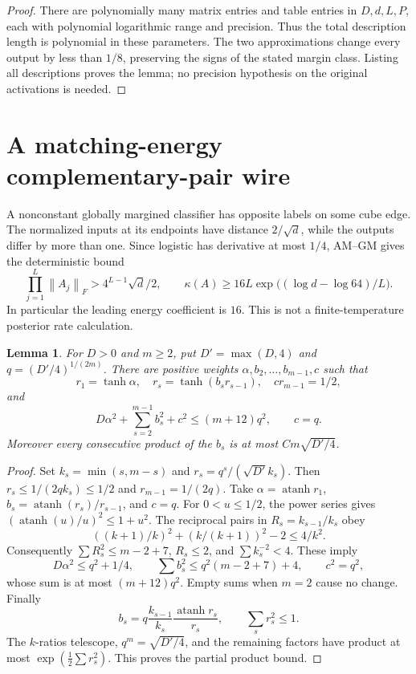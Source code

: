 \documentclass[11pt]{article}
\newtheorem{lemma}[theorem]{Lemma}
\theoremstyle{remark}\newtheorem{remark}[theorem]{Remark}
\newcommand{\norm}[1]{\left\lVert #1\right\rVert}
\begin{document}
\begin{proof}
There are polynomially many matrix entries and table entries in
$D,d,L,P$, each with polynomial logarithmic range and precision. Thus
the total description length is polynomial in these parameters. The
two approximations change every output by less than $1/8$, preserving
the signs of the stated margin class. Listing all descriptions proves
the lemma; no precision hypothesis on the original activations is needed.
\end{proof}

\section{A matching-energy complementary-pair wire}

A nonconstant globally margined classifier has opposite labels on some
cube edge. The normalized inputs at its endpoints have distance
$2/\sqrt d$, while the outputs differ by more than one. Since logistic
has derivative at most $1/4$, AM--GM gives the deterministic bound
\begin{equation}\label{eq:lower}
 \prod_{j=1}^L\norm{A_j}_F>4^{L-1}\sqrt d/2,\qquad
 \kappa(A)\ge16L\exp\bigl((\log d-\log64)/L\bigr).
\end{equation}
In particular the leading energy coefficient is $16$. This is not a
finite-temperature posterior rate calculation.

\begin{lemma}\label{lem:scalar}
For $D>0$ and $m\ge2$, put $D'=\max(D,4)$ and
$q=(D'/4)^{1/(2m)}$. There are positive weights
$\alpha,b_2,\ldots,b_{m-1},c$ such that
\[
 r_1=\tanh\alpha,\quad r_s=\tanh(b_s r_{s-1}),\quad
 cr_{m-1}=1/2,
\]
and
\[
 D\alpha^2+\sum_{s=2}^{m-1}b_s^2+c^2\le(m+12)q^2,
 \qquad c=q.
\]
Moreover every consecutive product of the $b_s$ is at most
$Cm\sqrt{D'/4}$.
\end{lemma}

\begin{proof}
Set $k_s=\min(s,m-s)$ and $r_s=q^s/(\sqrt{D'}k_s)$. Then
$r_s\le1/(2q k_s)\le1/2$ and $r_{m-1}=1/(2q)$. Take
$\alpha=\operatorname{atanh}r_1$, $b_s=\operatorname{atanh}(r_s)/r_{s-1}$,
and $c=q$. For $0<u\le1/2$, the power series gives
$(\operatorname{atanh}(u)/u)^2\le1+u^2$.
The reciprocal pairs in $R_s=k_{s-1}/k_s$ obey
\[
 ((k+1)/k)^2+(k/(k+1))^2-2\le4/k^2.
\]
Consequently $\sum R_s^2\le m-2+7$, $R_s\le2$, and
$\sum k_s^{-2}<4$. These imply
\[
 D\alpha^2\le q^2+1/4,\qquad
 \sum b_s^2\le q^2(m-2+7)+4,\qquad c^2=q^2,
\]
whose sum is at most $(m+12)q^2$. Empty sums when $m=2$ cause no change.
Finally
\[
 b_s=q\frac{k_{s-1}}{k_s}\frac{\operatorname{atanh}r_s}{r_s},
 \qquad \sum_s r_s^2\le1.
\]
The $k$-ratios telescope, $q^m=\sqrt{D'/4}$, and the remaining factors
have product at most $\exp(\frac12\sum r_s^2)$. This proves the partial
product bound.
\end{proof}
\end{document}
